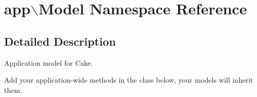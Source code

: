 \hypertarget{namespaceapp_1_1Model}{
\section{app$\backslash$\-Model \-Namespace \-Reference}
\label{namespaceapp_1_1Model}
}


\subsection{\-Detailed \-Description}
\-Application model for \-Cake.

\-Add your application-\/wide methods in the class below, your models will inherit them. 
